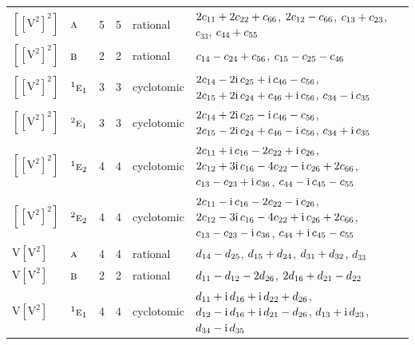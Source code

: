 \documentclass[10pt,a4paper]{article}
\numberwithin{equation}{section}
\newcommand{\irr}[1]{\text{\normalfont\scshape #1}}
\newcommand{\conjpair}[1]{{}^{#1}}
\newcommand{\iunit}{\mathrm{i}}
\newcommand{\jahn}[1]{\mathrm{#1}}
\newlength{\fillwidth}\newlength{\cellwidth}\newlength{\colwidth}
\newcommand{\signbreak}{\penalty100\relax}
\begin{document}
{\begin{longtable}{@{}llrrl>{\RaggedRight\arraybackslash}p{\fillwidth}@{}}
$\jahn{[[V^{2}]^{2}]}$ & $\irr{a}$ & 5 & 5 & rational & $2c_{11} +\signbreak 2c_{22} +\signbreak c_{66}$, $2c_{12} -\signbreak c_{66}$, $c_{13} +\signbreak c_{23}$, $c_{33}$, $c_{44} +\signbreak c_{55}$\\
$\jahn{[[V^{2}]^{2}]}$ & $\irr{b}$ & 2 & 2 & rational & $c_{14} -\signbreak c_{24} +\signbreak c_{56}$, $c_{15} -\signbreak c_{25} -\signbreak c_{46}$\\
$\jahn{[[V^{2}]^{2}]}$ & $\conjpair{1}\irr{e}_{1}$ & 3 & 3 & cyclotomic & $2c_{14} -\signbreak 2\iunit{}\,c_{25} +\signbreak \iunit{}\,c_{46} -\signbreak c_{56}$, $2c_{15} +\signbreak 2\iunit{}\,c_{24} +\signbreak c_{46} +\signbreak \iunit{}\,c_{56}$, $c_{34} -\signbreak \iunit{}\,c_{35}$\\
$\jahn{[[V^{2}]^{2}]}$ & $\conjpair{2}\irr{e}_{1}$ & 3 & 3 & cyclotomic & $2c_{14} +\signbreak 2\iunit{}\,c_{25} -\signbreak \iunit{}\,c_{46} -\signbreak c_{56}$, $2c_{15} -\signbreak 2\iunit{}\,c_{24} +\signbreak c_{46} -\signbreak \iunit{}\,c_{56}$, $c_{34} +\signbreak \iunit{}\,c_{35}$\\
$\jahn{[[V^{2}]^{2}]}$ & $\conjpair{1}\irr{e}_{2}$ & 4 & 4 & cyclotomic & $2c_{11} +\signbreak \iunit{}\,c_{16} -\signbreak 2c_{22} +\signbreak \iunit{}\,c_{26}$, $2c_{12} +\signbreak 3\iunit{}\,c_{16} -\signbreak 4c_{22} -\signbreak \iunit{}\,c_{26} +\signbreak 2c_{66}$, $c_{13} -\signbreak c_{23} +\signbreak \iunit{}\,c_{36}$, $c_{44} -\signbreak \iunit{}\,c_{45} -\signbreak c_{55}$\\
$\jahn{[[V^{2}]^{2}]}$ & $\conjpair{2}\irr{e}_{2}$ & 4 & 4 & cyclotomic & $2c_{11} -\signbreak \iunit{}\,c_{16} -\signbreak 2c_{22} -\signbreak \iunit{}\,c_{26}$, $2c_{12} -\signbreak 3\iunit{}\,c_{16} -\signbreak 4c_{22} +\signbreak \iunit{}\,c_{26} +\signbreak 2c_{66}$, $c_{13} -\signbreak c_{23} -\signbreak \iunit{}\,c_{36}$, $c_{44} +\signbreak \iunit{}\,c_{45} -\signbreak c_{55}$\\
$\jahn{V[V^{2}]}$ & $\irr{a}$ & 4 & 4 & rational & $d_{14} -\signbreak d_{25}$, $d_{15} +\signbreak d_{24}$, $d_{31} +\signbreak d_{32}$, $d_{33}$\\
$\jahn{V[V^{2}]}$ & $\irr{b}$ & 2 & 2 & rational & $d_{11} -\signbreak d_{12} -\signbreak 2d_{26}$, $2d_{16} +\signbreak d_{21} -\signbreak d_{22}$\\
$\jahn{V[V^{2}]}$ & $\conjpair{1}\irr{e}_{1}$ & 4 & 4 & cyclotomic & $d_{11} +\signbreak \iunit{}\,d_{16} +\signbreak \iunit{}\,d_{22} +\signbreak d_{26}$, $d_{12} -\signbreak \iunit{}\,d_{16} +\signbreak \iunit{}\,d_{21} -\signbreak d_{26}$, $d_{13} +\signbreak \iunit{}\,d_{23}$, $d_{34} -\signbreak \iunit{}\,d_{35}$\\

\end{longtable}}
\end{document}
